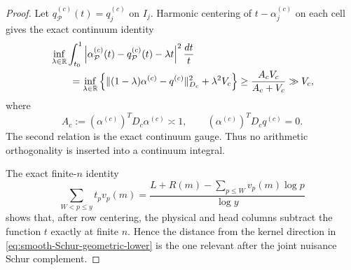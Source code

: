 \documentclass[11pt]{article}
\numberwithin{equation}{section}
\theoremstyle{definition}
\theoremstyle{remark}
\newcommand{\1}{\mathbf 1}
\begin{document}
\begin{proof}
Let \(q_{\mathcal P}^{(c)}(t)=q_j^{(c)}\) on \(I_j\).  Harmonic
centering of \(t-\alpha_j^{(c)}\) on each cell gives the exact
continuum identity
\begin{align}
 &\inf_{\lambda\in\mathbb R}
 \int_{t_0}^1\left|\alpha_{\mathcal P}^{(c)}(t)
       -q_{\mathcal P}^{(c)}(t)-\lambda t\right|^2\frac{dt}{t}
 \notag\\
 &\qquad=\inf_{\lambda\in\mathbb R}
 \left\{\|(1-\lambda)\alpha^{(c)}-q^{(c)}\|_{D_c}^2
       +\lambda^2V_c\right\}
 \geq \frac{A_cV_c}{A_c+V_c}\gg V_c,
 \label{eq:smooth-Schur-geometric-lower}
\end{align}
where
\[
 A_c:=(\alpha^{(c)})^TD_c\alpha^{(c)}\asymp1,
 \qquad (\alpha^{(c)})^TD_cq^{(c)}=0.
\]
The second relation is the exact continuum gauge.  Thus no arithmetic
orthogonality is inserted into a continuum integral.

The exact finite-\(n\) identity
\begin{equation}
 \sum_{W<p\leq y}t_pv_p(m)
 =\frac{L+R(m)-\sum_{p\leq W}v_p(m)\log p}{\log y}
\label{eq:smooth-exact-log-identity}
\end{equation}
shows that, after row centering, the physical and head columns subtract
the function \(t\) exactly at finite \(n\).  Hence the distance from
the kernel direction in \eqref{eq:smooth-Schur-geometric-lower} is the
one relevant after the joint nuisance Schur complement.


\end{proof}
\end{document}

